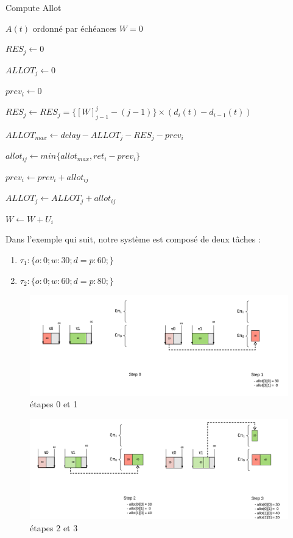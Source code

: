 	\label{algouedf}
	\begin{algorithm}[H]
		\caption{Compute Allot}
		\begin{algorithmic}
			\REQUIRE $A(t)$ ordonné par échéances
			\STATE $W = 0$
			
				\item $RES_j \leftarrow 0$
				\item $ALLOT_j \leftarrow 0$
			\ENDFOR
	
				\item $prev_i \leftarrow 0$
					\item $RES_j \leftarrow RES_j = \{[W]_{j-1}^{j} - (j - 1)\}\times (d_i(t) - d_{i-1}(t))$
					\item $ALLOT_{max} \leftarrow delay - ALLOT_j - RES_j - prev_i$
					\item $allot_{ij} \leftarrow min\{allot_{max}, ret_i - prev_i\}$
					\item $prev_i \leftarrow prev_i + allot_{ij}$
					\item $ALLOT_j \leftarrow ALLOT_j + allot_{ij}$
				\ENDFOR
				\item $W \leftarrow W + U_i$
			\ENDFOR
		\end{algorithmic}
	\end{algorithm}
	
	Dans l'exemple qui suit, notre système est composé de deux tâches :
	\begin{enumerate}
		\setlength\itemsep{0.1em}
		\item $\tau_1 : \{o:0; w:30; d=p:60;\}$
		\item $\tau_2 : \{o:0; w:60; d=p:80;\}$
	\end{enumerate}
	\begin{figure}[H]
		\includegraphics[scale=1]{img/uedf/uedf12}
		\caption{étapes 0 et 1}
	\end{figure}
	\begin{figure}[H]
		\includegraphics[scale=1]{img/uedf/uedf34}
		\caption{étapes 2 et 3}
	\end{figure}

